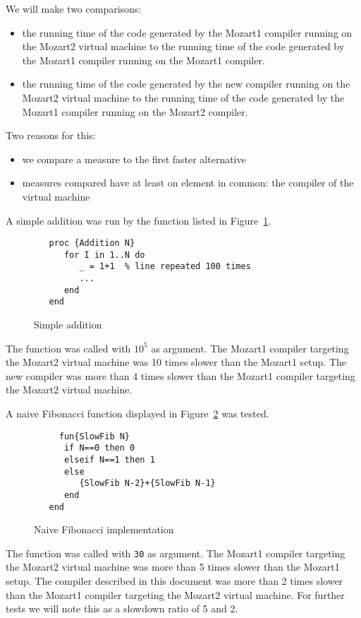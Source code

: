 \documentclass[a4paper]{memoir}
\begin{document}
We will make two comparisons:
\begin{itemize}
  \item the running time of the code generated by the Mozart1 compiler running
    on the Mozart2 virtual machine to the running time of the code generated by
    the Mozart1 compiler running on the Mozart1 compiler.
  \item the running time of the code generated by the new compiler running
    on the Mozart2 virtual machine to the running time of the code generated by
    the Mozart1 compiler running on the Mozart2 compiler.
\end{itemize}
Two reasons for this:
\begin{itemize}
  \item we compare a measure to the first faster alternative
  \item measures compared have at least on element in common: the compiler of
    the virtual machine
\end{itemize}

A simple addition was run by the function listed in Figure~\ref{fig:perf:add}.

\begin{figure}[h]
\begin{lstlisting}
   proc {Addition N}
      for I in 1..N do
         _ = 1+1  % line repeated 100 times
         ...
      end
   end
\end{lstlisting}
\caption{Simple addition}
\label{fig:perf:add}
\end{figure}

The function was called with $10^5$ as argument.
The Mozart1 compiler targeting the Mozart2 virtual machine was 10 times slower
than the Mozart1 setup. The new compiler was more than 4 times slower than the
Mozart1 compiler targeting the Mozart2 virtual machine.




A naive Fibonacci function displayed in
Figure~\ref{fig:perf:fib} was tested.

\begin{figure}[h]
\begin{lstlisting}
     fun{SlowFib N}
      if N==0 then 0
      elseif N==1 then 1
      else
         {SlowFib N-2}+{SlowFib N-1}
      end
   end
\end{lstlisting}
\caption{Naive Fibonacci implementation}
\label{fig:perf:fib}
\end{figure}

The function was called with \lstinline!30! as argument.
The Mozart1 compiler targeting the Mozart2 virtual machine was more than 5 times slower
than the Mozart1 setup. The compiler described in this document was more than 2 times slower than the
Mozart1 compiler targeting the Mozart2 virtual machine. For further tests we
will note this as a slowdown ratio of 5 and 2.
\end{document}
